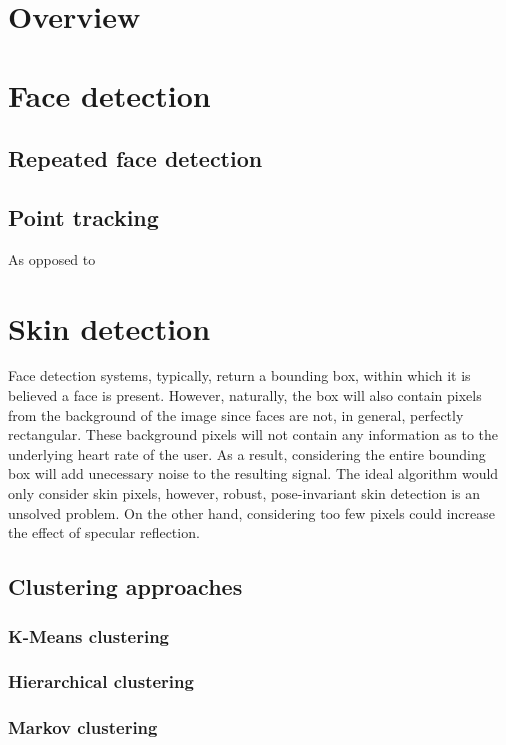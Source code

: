 \section{Overview}
\section{Face detection}
\subsection{Repeated face detection}
\subsection{Point tracking}
As opposed to 

\section{Skin detection}
Face detection systems, typically, return a bounding box, within which it is believed
a face is present. However, naturally, the box will also contain pixels from the background of 
the image since faces are not, in general, perfectly rectangular.
These background pixels will not contain any information as to the underlying heart rate of the user.
As a result, considering the entire bounding box will add unecessary noise to the resulting signal.
The ideal algorithm would only consider skin pixels, however, robust, pose-invariant skin detection is an unsolved problem.
On the other hand, considering too few pixels could increase the effect of specular reflection.

\subsection{Clustering approaches}
\subsubsection{K-Means clustering}
\subsubsection{Hierarchical clustering}
\subsubsection{Markov clustering}

\subsection{}
